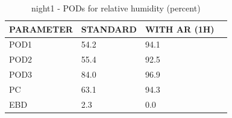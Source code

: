 \begin{table}[p!]
\begin{center}
\begin{tabular}{|l|l|l|l|}
\hline
\multicolumn{1}{|c|}{\cellcolor[HTML]{C0C0C0}\textbf{PARAMETER}} & \multicolumn{1}{c|}{\cellcolor[HTML]{C0C0C0}\textbf{STANDARD}} & \multicolumn{1}{c|}{\cellcolor[HTML]{C0C0C0}\textbf{WITH AR (1H)}} \\
\hline
\cellcolor[HTML]{C0C0C0}POD1  & 54.2                                & 94.1         \\
\cellcolor[HTML]{C0C0C0}POD2  & 55.4                                & 92.5         \\
\cellcolor[HTML]{C0C0C0}POD3  & 84.0                                & 96.9         \\
\cellcolor[HTML]{C0C0C0}PC    & 63.1                                  & 94.3           \\
\cellcolor[HTML]{C0C0C0}EBD   & 2.3                                 & 0.0          \\
\hline
\end{tabular}
\caption{night1 - PODs for relative humidity (percent)}
\label{tab:podrh:night1}
\end{center}
\end{table}
